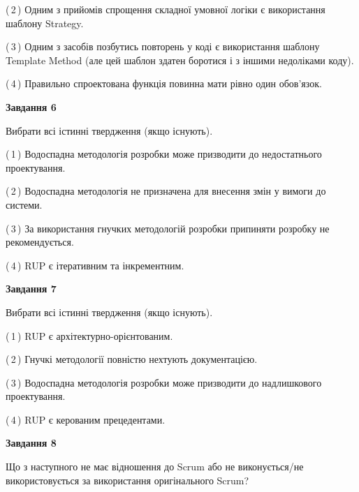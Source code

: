\documentclass[10pt, ukrainian]{article}
\begin{document}
{\begin {large}
(\,2\,) Одним з прийомів спрощення складної умовної логіки є використання шаблону Strategy. %



(\,3\,) Одним з засобів позбутись повторень у коді є використання шаблону Template Method (але цей шаблон здатен боротися і з іншими недоліками коду). %



(\,4\,) Правильно спроектована функція повинна мати рівно один обов'язок. %

\newpage

{\begin {center}\textbf{Завдання 6}\end {center}}\par
Вибрати всі істинні твердження (якщо існують).\par
\vspace{2mm}



(\,1\,) Водоспадна методологія розробки може призводити до недостатнього проектування. %



(\,2\,) Водоспадна методологія не призначена для внесення змін у вимоги до системи. %



(\,3\,) За використання гнучких методологій розробки припиняти розробку не рекомендується. %



(\,4\,) RUP є ітеративним та інкрементним.%


{\begin {center}\textbf{Завдання 7}\end {center}}\par
Вибрати всі істинні твердження (якщо існують).\par
\vspace{2mm}



(\,1\,) RUP є архітектурно-орієнтованим. %



(\,2\,) Гнучкі методології повністю нехтують документацією. %



(\,3\,) Водоспадна методологія розробки може призводити до надлишкового проектування. %



(\,4\,) RUP є керованим прецедентами. %


{\begin {center}\textbf{Завдання 8}\end {center}}\par
Що з наступного не має відношення до Scrum або не виконується/не використовується за використання оригінального Scrum?\par
\vspace{2mm}




\end{large}}
\end{document}
